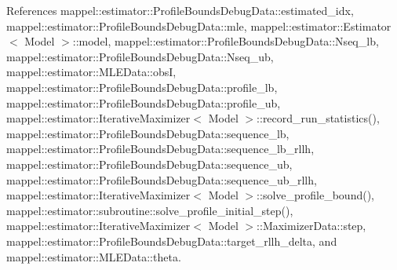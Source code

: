 References mappel\+::estimator\+::\+Profile\+Bounds\+Debug\+Data\+::estimated\+\_\+idx, mappel\+::estimator\+::\+Profile\+Bounds\+Debug\+Data\+::mle, mappel\+::estimator\+::\+Estimator$<$ Model $>$\+::model, mappel\+::estimator\+::\+Profile\+Bounds\+Debug\+Data\+::\+Nseq\+\_\+lb, mappel\+::estimator\+::\+Profile\+Bounds\+Debug\+Data\+::\+Nseq\+\_\+ub, mappel\+::estimator\+::\+M\+L\+E\+Data\+::obsI, mappel\+::estimator\+::\+Profile\+Bounds\+Debug\+Data\+::profile\+\_\+lb, mappel\+::estimator\+::\+Profile\+Bounds\+Debug\+Data\+::profile\+\_\+ub, mappel\+::estimator\+::\+Iterative\+Maximizer$<$ Model $>$\+::record\+\_\+run\+\_\+statistics(), mappel\+::estimator\+::\+Profile\+Bounds\+Debug\+Data\+::sequence\+\_\+lb, mappel\+::estimator\+::\+Profile\+Bounds\+Debug\+Data\+::sequence\+\_\+lb\+\_\+rllh, mappel\+::estimator\+::\+Profile\+Bounds\+Debug\+Data\+::sequence\+\_\+ub, mappel\+::estimator\+::\+Profile\+Bounds\+Debug\+Data\+::sequence\+\_\+ub\+\_\+rllh, mappel\+::estimator\+::\+Iterative\+Maximizer$<$ Model $>$\+::solve\+\_\+profile\+\_\+bound(), mappel\+::estimator\+::subroutine\+::solve\+\_\+profile\+\_\+initial\+\_\+step(), mappel\+::estimator\+::\+Iterative\+Maximizer$<$ Model $>$\+::\+Maximizer\+Data\+::step, mappel\+::estimator\+::\+Profile\+Bounds\+Debug\+Data\+::target\+\_\+rllh\+\_\+delta, and mappel\+::estimator\+::\+M\+L\+E\+Data\+::theta.

